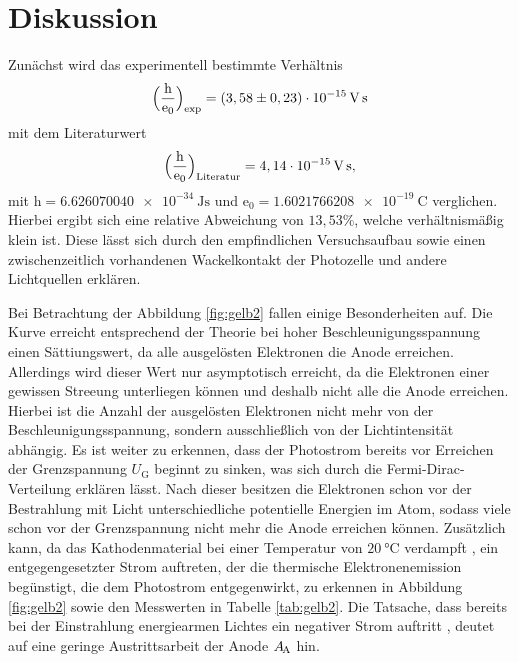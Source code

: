 \section{Diskussion}
\label{sec:Diskussion}

Zunächst wird das experimentell bestimmte Verhältnis 
\begin{align*}
\Bigl(\frac{\mathrm{h}}{\mathrm{e_0}}\Bigr)_\text{exp} = (3,58 \pm 0,23)\cdot 10^{-15}\,\si{\volt\second} 
\end{align*}
mit dem Literaturwert 
\begin{align*}
\Bigl(\frac{\mathrm{h}}{\mathrm{e_0}}\Bigr)_\text{Literatur} = 4,14 \cdot 10^{-15}\,\si{\volt\second}, 
\end{align*}
mit $\mathrm{h} = \SI{6.626070040e-34}{\joule\second}$ \cite{h} und $\mathrm{e_0} = \SI{1.6021766208e-19}{\coulomb}$ \cite{e} verglichen.
Hierbei ergibt sich eine relative Abweichung von $13,53\%$, welche verhältnismäßig klein ist.
Diese lässt sich durch den empfindlichen Versuchsaufbau sowie einen zwischenzeitlich vorhandenen
Wackelkontakt der Photozelle und andere Lichtquellen erklären.

\noindent Bei Betrachtung der Abbildung \ref{fig:gelb2} fallen einige Besonderheiten auf.
Die Kurve erreicht entsprechend der Theorie bei hoher Beschleunigungsspannung einen Sättiungswert,
da alle ausgelösten Elektronen die Anode erreichen. Allerdings wird dieser Wert nur asymptotisch erreicht, da die Elektronen einer gewissen Streeung unterliegen können und deshalb nicht alle die Anode erreichen.
Hierbei ist die Anzahl der ausgelösten Elektronen nicht mehr von der Beschleunigungsspannung, sondern ausschließlich von der Lichtintensität abhängig.
Es ist weiter zu erkennen, dass der Photostrom bereits vor Erreichen der Grenzspannung $U_\text{G}$
beginnt zu sinken, was sich durch die Fermi-Dirac-Verteilung erklären lässt. Nach dieser besitzen die
Elektronen schon vor der Bestrahlung mit Licht unterschiedliche potentielle Energien im Atom, sodass viele
schon vor der Grenzspannung nicht mehr die Anode erreichen können. Zusätzlich kann, da das 
Kathodenmaterial bei einer Temperatur von $\SI{20}{\celsius}$
verdampft \cite{kent}, ein entgegengesetzter Strom auftreten, 
der die thermische Elektronenemission begünstigt, die dem Photostrom entgegenwirkt, zu erkennen in Abbildung \ref{fig:gelb2}
sowie den Messwerten in Tabelle \ref{tab:gelb2}.
Die Tatsache, dass bereits bei der Einstrahlung energiearmen Lichtes ein negativer Strom auftritt \cite{kent}, deutet auf eine geringe
Austrittsarbeit der Anode $A_\text{\!A}$ hin. 

